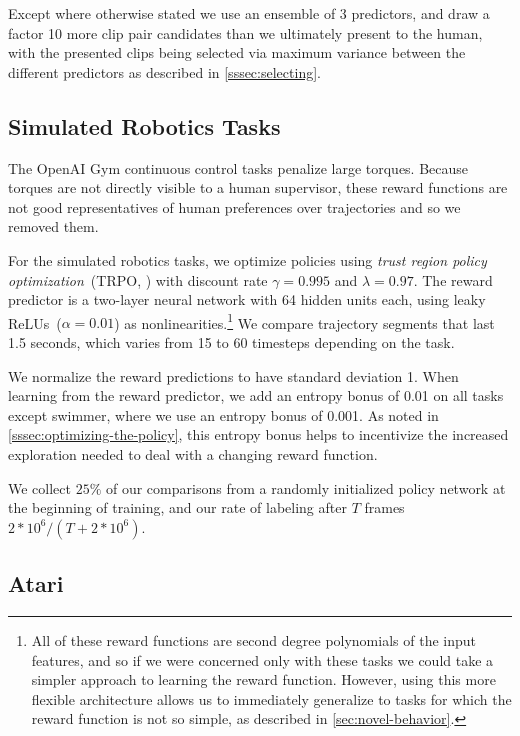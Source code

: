 \documentclass{article}
\begin{document}
Except where otherwise stated we use an ensemble of 3 predictors, and draw a factor 10 more clip pair candidates than we ultimately present to the human, with the presented clips being selected via maximum variance between the different predictors as described in \autoref{sssec:selecting}.


\subsection{Simulated Robotics Tasks}\label{app:mujoco-details}

The OpenAI Gym continuous control tasks penalize large torques.
Because torques are not directly visible to a human supervisor,
these reward functions are not good representatives of human preferences over trajectories and so we removed them.

For the simulated robotics tasks,
we optimize policies using \emph{trust region policy optimization}~(TRPO, \citealp{Schulman15})
with discount rate $\gamma = 0.995$ and $\lambda = 0.97$.
The reward predictor is a two-layer neural network with 64 hidden units each,
using leaky ReLUs~($\alpha = 0.01$) as nonlinearities.\footnote{All of these reward functions are second degree polynomials of the input features, and so if we were concerned only with these tasks we could take a simpler approach to learning the reward function. However, using this more flexible architecture allows us to immediately generalize to tasks for which the reward function is not so simple, as described in \autoref{sec:novel-behavior}.}
We compare trajectory segments that last 1.5 seconds, which varies from 15 to 60 timesteps depending on the task.

We normalize the reward predictions to have standard deviation 1.
When learning from the reward predictor, we add an entropy bonus of 0.01 on all tasks except swimmer, where we use an entropy bonus of 0.001.  As noted in \autoref{sssec:optimizing-the-policy}, this entropy bonus helps to incentivize the increased exploration needed to deal with a changing reward function.

We collect $25\%$ of our comparisons from a randomly initialized policy network at the beginning of training,
and our rate of labeling after $T$ frames
$2*10^6 / (T+2*10^6)$.


\subsection{Atari}\label{app:atari-details}
\end{document}

